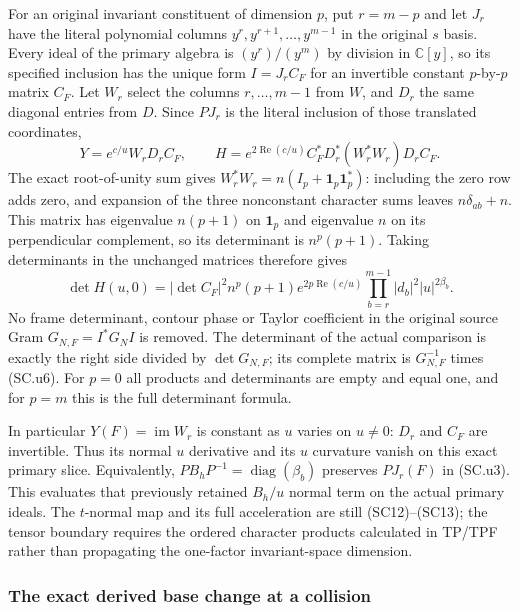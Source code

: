 For an original invariant constituent of dimension $p$, put
$r=m-p$ and let $J_r$ have the literal polynomial columns
$y^r,y^{r+1},\ldots,y^{m-1}$ in the original $s$ basis.
Every ideal of the primary algebra is $(y^r)/(y^m)$ by
division in $\mathbb C[y]$, so its specified inclusion has
the unique form $I=J_r C_F$ for an invertible constant
$p$-by-$p$ matrix $C_F$.  Let $W_r$ select the columns
$r,\ldots,m-1$ from $W$, and $D_r$ the same diagonal entries
from $D$.  Since $PJ_r$ is the literal inclusion of those
translated coordinates,
\[
 Y=e^{c/u}W_rD_r C_F,\qquad
 H=e^{2\operatorname{Re}(c/u)}
            C_F^*D_r^*(W_r^*W_r)D_r C_F.             \tag{SC.u6}
\]
The exact root-of-unity sum gives
$W_r^*W_r=n(I_p+\mathbf1_p\mathbf1_p^*)$:
including the zero row adds zero, and expansion of the
three nonconstant character sums leaves $n\delta_{ab}+n$.
This matrix has eigenvalue $n(p+1)$ on $\mathbf1_p$
and eigenvalue $n$ on its perpendicular complement, so
its determinant is $n^p(p+1)$.  Taking determinants in
the unchanged matrices therefore gives
\[
 \boxed{\det H(u,0)=|\det C_F|^2 n^p(p+1)
       e^{2p\operatorname{Re}(c/u)}
       \prod_{b=r}^{m-1}|d_b|^2|u|^{2\beta_b}.}       \tag{SC.u7}
\]
No frame determinant, contour phase or Taylor coefficient
in the original source Gram $G_{N,F}=I^*G_NI$ is removed.
The determinant of the actual comparison is exactly
the right side divided by $\det G_{N,F}$; its complete
matrix is $G_{N,F}^{-1}$ times (SC.u6).
For $p=0$ all products and determinants are empty and equal
one, and for $p=m$ this is the full determinant formula.

In particular $Y(F)=\operatorname{im}W_r$ is constant as
$u$ varies on $u\ne0$: $D_r$ and $C_F$ are invertible.
Thus its normal $u$ derivative and its $u$ curvature vanish
on this exact primary slice.  Equivalently,
$PB_hP^{-1}=\operatorname{diag}(\beta_b)$ preserves
$PJ_r(F)$ in (SC.u3).  This evaluates that previously
retained $B_h/u$ normal term on the actual primary ideals.
The $t$-normal map and its full acceleration are still
(SC12)--(SC13); the tensor boundary requires the ordered
character products calculated in TP/TPF rather than
propagating the one-factor invariant-space dimension.

\subsubsection{The exact derived base change at a collision}

